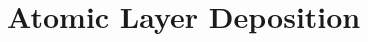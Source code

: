 \documentclass[../thesis.tex]{subfiles}
\begin{document}
    \section{Atomic Layer Deposition}
    \label{sec:ald}
\end{document}
